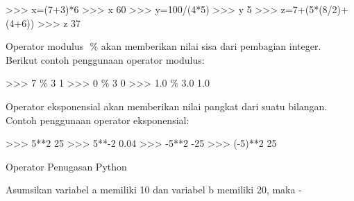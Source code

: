 \vspace{12pt}
\noindent
>>> x=(7+3)*6\vspace{\baselineskip}
>>> x\vspace{\baselineskip}
60\vspace{\baselineskip}
>>> y=100/(4*5)\vspace{\baselineskip}
>>> y\vspace{\baselineskip}
5\vspace{\baselineskip}
>>> z=7+(5*(8/2)+(4+6))\vspace{\baselineskip}
>>> z\vspace{\baselineskip}
37 \par
\vspace{12pt}
\noindent
Operator modulus $  $ $  \%  $ $  $akan memberikan nilai sisa dari pembagian integer. Berikut contoh penggunaan operator modulus: \par
\vspace{12pt}
\noindent
>>> 7  $  \%  $ 3\vspace{\baselineskip}
1\vspace{\baselineskip}
>>> 0  $  \%  $ 3\vspace{\baselineskip}
0\vspace{\baselineskip}
>>> 1.0  $  \%  $ 3.0\vspace{\baselineskip}
1.0 \par
\vspace{12pt}
\noindent
Operator eksponensial $  $akan memberikan nilai pangkat dari suatu bilangan. Contoh penggunaan operator eksponensial: \par
\vspace{12pt}
\noindent
>>> 5**2\vspace{\baselineskip}
25\vspace{\baselineskip}
>>> 5**-2\vspace{\baselineskip}
0.04\vspace{\baselineskip}
>>> -5**2\vspace{\baselineskip}
-25\vspace{\baselineskip}
>>> (-5)**2\vspace{\baselineskip}
25 \par
\vspace{12pt}
\noindent
Operator Penugasan Python \par
\vspace{12pt}
\noindent
Asumsikan variabel a memiliki 10 dan variabel b memiliki 20, maka - \par
\vspace{12pt}
